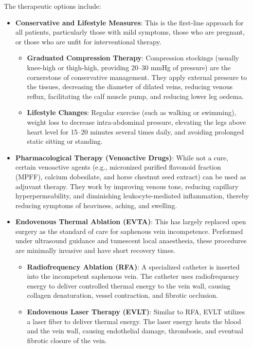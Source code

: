 The therapeutic options include:
\begin{itemize}
\item \textbf{Conservative and Lifestyle Measures}: This is the first-line approach for all patients, particularly those with mild symptoms, those who are pregnant, or those who are unfit for interventional therapy.
    \begin{itemize}
    \item \textbf{Graduated Compression Therapy}: Compression stockings (usually knee-high or thigh-high, providing 20--30 mmHg of pressure) are the cornerstone of conservative management. They apply external pressure to the tissues, decreasing the diameter of dilated veins, reducing venous reflux, facilitating the calf muscle pump, and reducing lower leg oedema.
    \item \textbf{Lifestyle Changes}: Regular exercise (such as walking or swimming), weight loss to decrease intra-abdominal pressure, elevating the legs above heart level for 15--20 minutes several times daily, and avoiding prolonged static sitting or standing.
    \end{itemize}
\item \textbf{Pharmacological Therapy (Venoactive Drugs)}: While not a cure, certain venoactive agents (e.g., micronized purified flavonoid fraction (MPFF), calcium dobesilate, and horse chestnut seed extract) can be used as adjuvant therapy. They work by improving venous tone, reducing capillary hyperpermeability, and diminishing leukocyte-mediated inflammation, thereby reducing symptoms of heaviness, aching, and swelling.
\item \textbf{Endovenous Thermal Ablation (EVTA)}: This has largely replaced open surgery as the standard of care for saphenous vein incompetence. Performed under ultrasound guidance and tumescent local anaesthesia, these procedures are minimally invasive and have short recovery times.
    \begin{itemize}
    \item \textbf{Radiofrequency Ablation (RFA)}: A specialized catheter is inserted into the incompetent saphenous vein. The catheter uses radiofrequency energy to deliver controlled thermal energy to the vein wall, causing collagen denaturation, vessel contraction, and fibrotic occlusion.
    \item \textbf{Endovenous Laser Therapy (EVLT)}: Similar to RFA, EVLT utilizes a laser fiber to deliver thermal energy. The laser energy heats the blood and the vein wall, causing endothelial damage, thrombosis, and eventual fibrotic closure of the vein.

\end{itemize}
\end{itemize}
